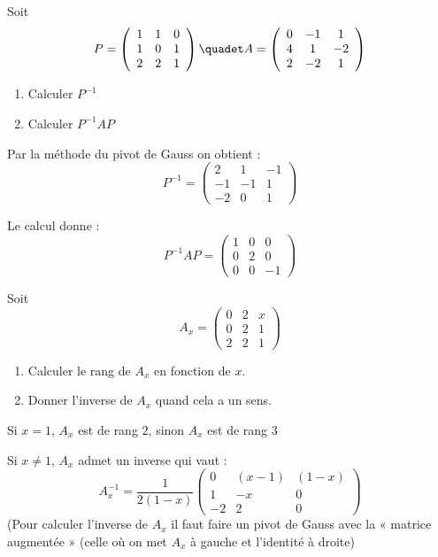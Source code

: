 \documentclass[a4paper, 11pt,reqno]{article}
\begin{document}
\begin{exercice}

 Soit $$P= \left(
\begin{array}{ccc}
1&1&0\\
1&0&1\\
2&2&1
\end{array}
 \right) \quadet A=\left(
\begin{array}{ccc}
0&-1&1\\
4&1&-2\\
2&-2&1
\end{array}
 \right)$$

\begin{enumerate}
\item  Calculer $P^{-1}$
\item Calculer $P^{-1}AP$
\end{enumerate}
\end{exercice}
\begin{correction} Par la  méthode du pivot de Gauss on obtient : 
$$P^{-1} = \left(
\begin{array}{ccc}
2&1&-1\\
-1&-1&1\\
-2&0&1
\end{array}
 \right) $$
 
 Le calcul donne : 
 $$P^{-1} A P = \left(
\begin{array}{ccc}
1&0&0\\
0&2&0\\
0&0&-1
\end{array}
 \right) $$
\end{correction}


\begin{exercice}
Soit $$ A_x=\left(\begin{array}{rrr}  0&2&x\\0&2&1\\2&2&1 \end{array}\right)$$
\begin{enumerate}
\item Calculer le rang de $A_x$ en fonction de $x$.
\item Donner l'inverse de $A_x$ quand cela a un sens.
\end{enumerate}
\end{exercice}
\begin{correction}
Si $x=1$, $A_x$ est de rang $2$, sinon $A_x$ est de rang 3

Si $x\neq 1$, $A_x$ admet un inverse qui vaut : 
$$A_x^{-1} = \frac{1}{2(1-x) }\left(\begin{array}{ccc}  0&(x-1) & (1-x) \\1 & -x& 0\\ -2&2&0 \end{array}\right)$$
(Pour calculer l'inverse de $A_x$ il faut faire un pivot de Gauss avec la « matrice augmentée » (celle où on met $A_x$ à gauche et l’identité à droite)  
\end{correction}
\end{document}
